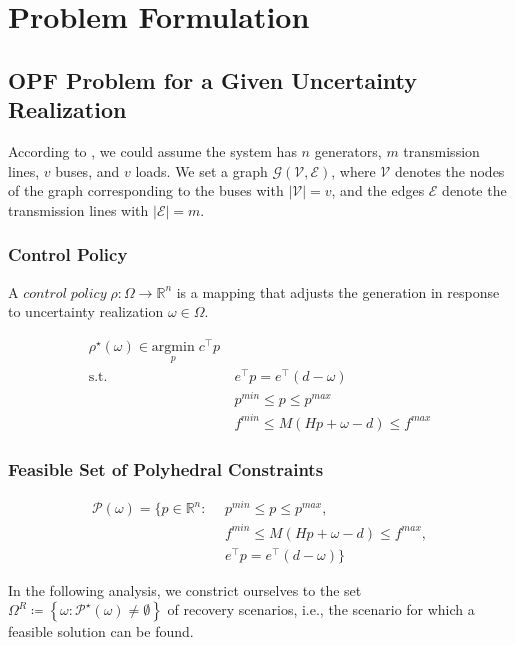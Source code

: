 \documentclass[11pt]{article}
\begin{document}
\section{Problem Formulation}\label{sec:problem}
\subsection{OPF Problem for a Given Uncertainty Realization}
According to \cite{1802.09639}, we could assume the system has $n$ generators, $m$ transmission lines, $v$ buses, and $v$ loads. We set a graph $\mathcal{G}( \mathcal{V}, \mathcal{E})$, where $\mathcal{V}$ denotes the nodes of the graph corresponding to the buses with $\left| \mathcal{V} \right| = v$, and the edges $\mathcal{E}$ denote the transmission lines with $\left| \mathcal{E} \right| = m$.

\subsubsection{Control Policy}
A $control \; policy \; \rho : \Omega \rightarrow \mathbb{R}^{n}$ is a mapping that adjusts the generation in response to uncertainty realization $\omega \in \Omega$. 

\begin{align}\label{eq:opf}
\rho^{\star}\left (  \omega \right )\in \underset{p}{\mathrm{argmin}} \; c^{\top }p \\
\textrm{s.t.} ~ &~ e^{\top }p=e^{\top }\left ( d -\omega  \right ) \\
~&~ p^{min}\leq p\leq p^{max} \\
~&~ f^{min}\leq M\left ( Hp +\omega -d \right )  \leq f^{max}
\end{align}

\subsubsection{Feasible Set of Polyhedral Constraints}
\begin{align}\label{eq:opf_poly}
\mathcal{P}\left ( \omega \right ) =  \{ p\in\mathbb{R}^{n}:
~ &~p^{min}\leq p\leq p^{max}, \nonumber \\
~ &~ f^{min}\leq M\left ( Hp +\omega -d \right )  \leq f^{max}, \nonumber \\
~ &~ e^{\top }p=e^{\top }\left ( d -\omega  \right )  \}
\end{align}

In the following analysis, we constrict ourselves to the set $\Omega^{R}\coloneqq\left \{ \omega:\mathcal{P}^{\star} \left ( \omega \right )\neq \emptyset \right \}$ of recovery scenarios, i.e., the scenario for which a feasible solution can be found. 
\end{document}
